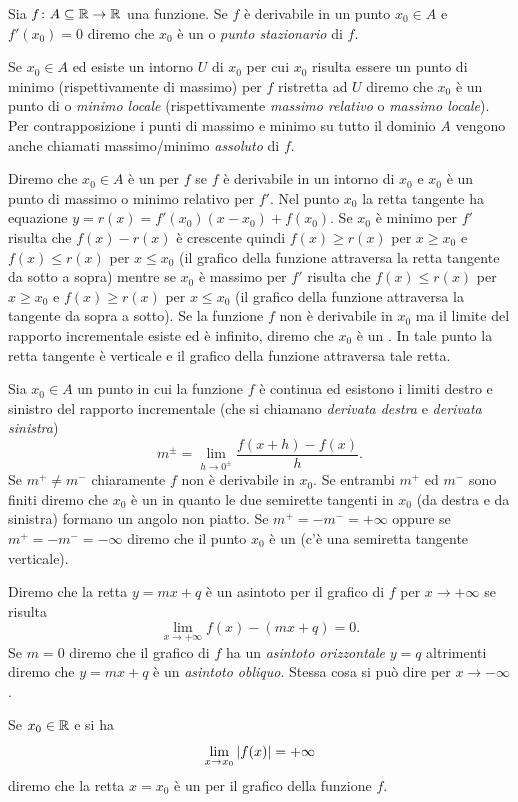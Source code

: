 \begin{definition}
Sia $f\colon A \subseteq \mathbb R \to \mathbb R$ una funzione. Se $f$ è derivabile in un
punto $x_0\in A$ e $f'(x_0) = 0$ diremo che $x_0$ è un 
o
\emph{punto stazionario}
di $f$.

Se $x_0\in A$ ed esiste un intorno $U$ di $x_0$ per cui $x_0$ risulta
essere un punto di minimo (rispettivamente di massimo) per $f$ ristretta ad $U$
diremo che $x_0$ è un punto di  o \emph{minimo locale}
(rispettivamente \emph{massimo relativo} o \emph{massimo locale}).
Per contrapposizione i punti di massimo e minimo su tutto il dominio $A$
vengono anche
chiamati massimo/minimo \emph{assoluto} di $f$.

Diremo che $x_0\in A$ è un  per $f$ se
$f$ è derivabile in un intorno di $x_0$ e $x_0$ è un punto di massimo
o minimo relativo per $f'$. Nel punto $x_0$ la retta tangente
ha equazione $y=r(x) = f'(x_0) (x-x_0) + f(x_0)$. Se $x_0$ è
minimo per $f'$ risulta che $f(x)-r(x)$ è crescente
quindi $f(x)\ge r(x)$ per $x\ge x_0$ e $f(x)\le r(x)$ per $x\le x_0$
(il grafico della funzione attraversa la retta tangente da sotto a sopra)
mentre se $x_0$ è massimo per $f'$ risulta che $f(x)\le r(x)$ per $x\ge x_0$
e $f(x) \ge r(x)$ per $x\le x_0$ (il grafico della funzione attraversa
la tangente da sopra a sotto).
Se la funzione $f$ non è derivabile in $x_0$ ma il limite del rapporto
incrementale esiste ed è infinito, diremo che $x_0$ è un
. In tale punto la retta tangente è verticale
e il grafico della funzione attraversa tale retta.

Sia $x_0\in A$ un punto in cui la funzione $f$ è continua ed esistono
i limiti destro e sinistro del rapporto incrementale
(che si chiamano \emph{derivata destra} e \emph{derivata sinistra})
\[
  m^{\pm} = \lim_{h\to 0^\pm}\frac{f(x+h) - f(x)}{h}.
\]
Se $m^+ \neq m^-$ chiaramente $f$ non è derivabile in $x_0$.
Se entrambi $m^+$ ed $m^-$ sono finiti diremo che $x_0$ è un
 in quanto le due semirette tangenti
in $x_0$ (da destra e da sinistra) formano un angolo non piatto.
Se $m^+=-m^-=+\infty$ oppure se $m^+=-m^-=-\infty$
diremo che il punto $x_0$ è un  (c'è una
semiretta tangente verticale).
\end{definition}

\begin{definition}[asintoti]
Diremo che la retta $y=mx+q$ è un asintoto per il grafico di $f$ 
per $x\to +\infty$ se risulta
\[
  \lim_{x\to +\infty} f(x) - (mx+q) = 0.
\]
Se $m=0$ diremo che il grafico di $f$ ha un \emph{asintoto orizzontale} $y=q$
%
%
%
altrimenti diremo che $y=mx+q$ è un \emph{asintoto obliquo}.
Stessa cosa si può dire per $x\to -\infty$.

Se $x_0\in \mathbb R$ e si ha 
\[
  \lim_{x\to x_0} {\left|f(x)\right|} = +\infty
\]
diremo che la retta $x=x_0$ è un  per il 
grafico della funzione $f$.
\end{definition}

